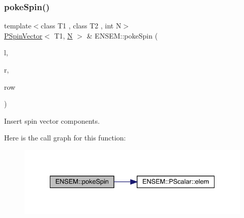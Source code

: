 \mbox{\label{group__primspinvector_ga55ef7594c5803a6f510d30a63e5aab4b}} 
\subsubsection{\texorpdfstring{pokeSpin()}{pokeSpin()}}
{\footnotesize\ttfamily template$<$class T1 , class T2 , int N$>$ \\
\mbox{\hyperlink{classENSEM_1_1PSpinVector}{P\+Spin\+Vector}}$<$ T1, \mbox{\hyperlink{adat__devel_2lib_2hadron_2operator__name__util_8cc_a7722c8ecbb62d99aee7ce68b1752f337}{N}} $>$ \& E\+N\+S\+E\+M\+::poke\+Spin (\begin{DoxyParamCaption}\item[{\mbox{\hyperlink{classENSEM_1_1PSpinVector}{P\+Spin\+Vector}}$<$ T1, \mbox{\hyperlink{adat__devel_2lib_2hadron_2operator__name__util_8cc_a7722c8ecbb62d99aee7ce68b1752f337}{N}} $>$ \&}]{l,  }\item[{const \mbox{\hyperlink{classENSEM_1_1PScalar}{P\+Scalar}}$<$ T2 $>$ \&}]{r,  }\item[{int}]{row }\end{DoxyParamCaption})\hspace{0.3cm}{\ttfamily [inline]}}



Insert spin vector components. 

Here is the call graph for this function\+:\nopagebreak
\begin{figure}[H]
\begin{center}
\leavevmode
\includegraphics[width=334pt]{dd/d6d/group__primspinvector_ga55ef7594c5803a6f510d30a63e5aab4b_cgraph}
\end{center}
\end{figure}
